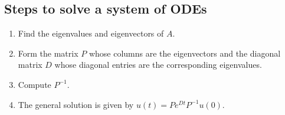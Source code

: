 \begin{mdframed}
\subsection{Steps to solve a system of ODEs}
\begin{enumerate}
\item Find the eigenvalues and eigenvectors of $A$.
\item Form the matrix $P$ whose columns are the eigenvectors and the diagonal matrix $D$ whose diagonal entries are the corresponding eigenvalues.
\item Compute $P^{-1}$.
\item The general solution is given by $u(t) = P e^{Dt} P^{-1} u(0)$.
\end{enumerate}
\end{mdframed}

